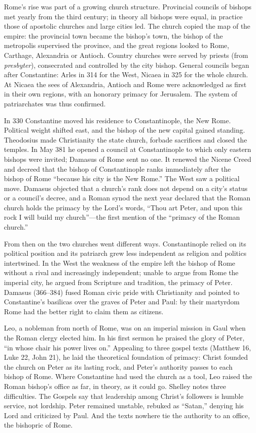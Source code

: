 Rome's rise was part of a growing church structure. Provincial councils of bishops met yearly from
the third century; in theory all bishops were equal, in practice those of apostolic churches and
large cities led. The church copied the map of the empire: the provincial town became the bishop's
town, the bishop of the metropolis supervised the province, and the great regions looked to Rome,
Carthage, Alexandria or Antioch. Country churches were served by priests (from \emph{presbyter}),
consecrated and controlled by the city bishop. General councils began after Constantine: Arles in 314
for the West, Nicaea in 325 for the whole church. At Nicaea the sees of Alexandria, Antioch and Rome were acknowledged as first in their own regions, with an honorary primacy for Jerusalem. The system of
patriarchates was thus confirmed.

In 330 Constantine moved his residence to Constantinople, the New Rome. Political weight shifted
east, and the bishop of the new capital gained standing. Theodosius made Christianity the state
church, forbade sacrifices and closed the temples. In May 381 he opened a council at Constantinople to
which only eastern bishops were invited; Damasus of Rome sent no one. It renewed the Nicene Creed and
decreed that the bishop of Constantinople ranks immediately after the bishop of Rome ``because his
city is the New Rome.'' The West saw a political move. Damasus objected that a church's rank does not
depend on a city's status or a council's decree, and a Roman synod the next year declared that the
Roman church holds the primacy by the Lord's words, ``Thou art Peter, and upon this rock I will build
my church''---the first mention of the ``primacy of the Roman church.''

From then on the two churches went different ways. Constantinople relied on its political position
and its patriarch grew less independent as religion and politics intertwined. In the West the
weakness of the empire left the bishop of Rome without a rival and increasingly independent; unable
to argue from Rome the imperial city, he argued from Scripture and tradition, the primacy of Peter.
Damasus (366--384) fused Roman civic pride with Christianity and pointed to Constantine's basilicas
over the graves of Peter and Paul: by their martyrdom Rome had the better right to claim them as
citizens.

Leo, a nobleman from north of Rome, was on an imperial mission in Gaul when the Roman clergy elected
him. In his first sermon he praised the glory of Peter, ``in whose chair his power lives on.''
Appealing to three gospel texts (Matthew 16, Luke 22, John 21), he laid the theoretical foundation of
primacy: Christ founded the church on Peter as its lasting rock, and Peter's authority passes to each bishop of Rome. Where Constantine had used the church as a tool, Leo raised the Roman bishop's office as
far, in theory, as it could go. Shelley notes three difficulties. The Gospels say that leadership
among Christ's followers is humble service, not lordship. Peter remained unstable, rebuked as
``Satan,'' denying his Lord and criticized by Paul. And the texts nowhere tie the authority to an
office, the bishopric of Rome.


